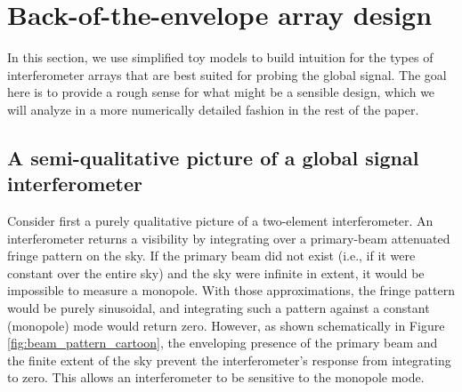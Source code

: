 \documentclass[twocolumn,apj,numberedappendix]{emulateapj}
\newcommand{\acl}[1]{{\color{red} \textbf{[ACL:  #1]}}}
\begin{document}
%

\section{Back-of-the-envelope array design}
\label{sec:BackOfEnvelopeArrayDesign}

In this section, we use simplified toy models to build intuition for the types of interferometer arrays that are best suited for probing the global signal.  The goal here is to provide a rough sense for what might be a sensible design, which we will analyze in a more numerically detailed fashion in the rest of the paper.

\subsection{A semi-qualitative picture of a global signal interferometer}
\label{sec:PictorialToyIntro}
Consider first a purely qualitative picture of a two-element interferometer. An interferometer returns a visibility by integrating over a primary-beam attenuated fringe pattern on the sky. If the primary beam did not exist (i.e., if it were constant over the entire sky) and the sky were infinite in extent, it would be impossible to measure a monopole. With those approximations, the fringe pattern would be purely sinusoidal, and integrating such a pattern against a constant (monopole) mode would return zero. However, as shown schematically in Figure \ref{fig:beam_pattern_cartoon}, the enveloping presence of the primary beam and the finite extent of the sky prevent the interferometer's response from integrating to zero. This allows an interferometer to be sensitive to the monopole mode.
\end{document}
